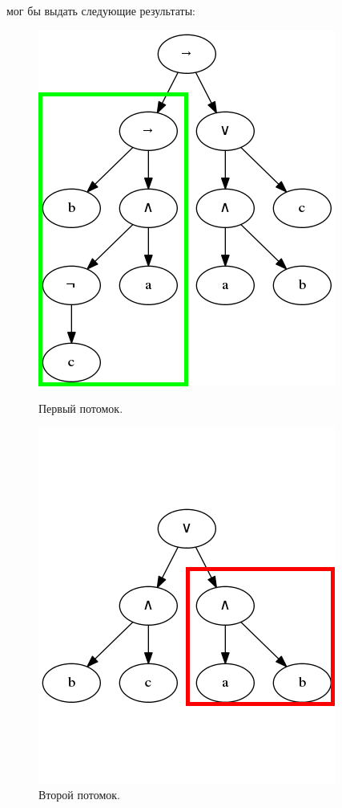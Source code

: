 \documentclass[12pt,fleqn]{article}
\begin{document}
\FloatBarrier

мог бы выдать следующие результаты:

\FloatBarrier

\begin{figure}[!h]%
  \centering
  \begin{minipage}{2in}%
    \centering
    \includegraphics[scale=0.3]{t3.png}
    \caption{Первый потомок.}
  \end{minipage}%
  \qquad
  \begin{minipage}{2in}%
    \centering
    \includegraphics[scale=0.3]{t4.png}
    \caption{Второй потомок.}
  \end{minipage}%
\end{figure}
\end{document}
